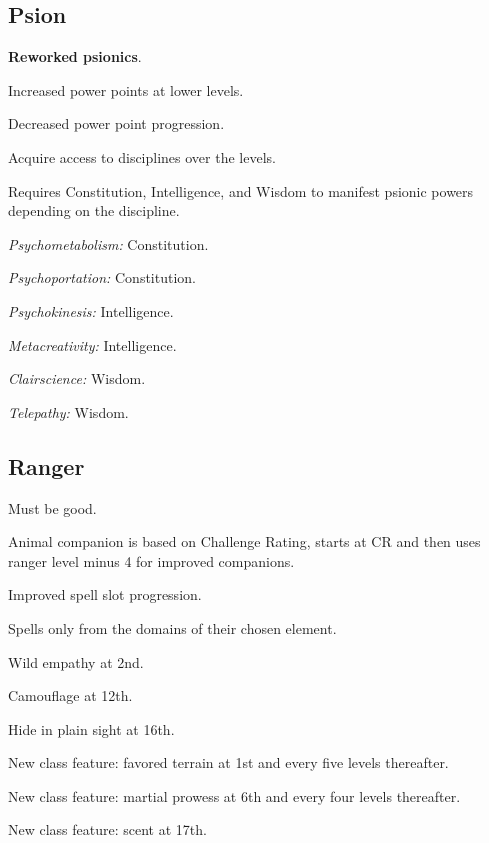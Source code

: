 \subsection{Psion}
\begin{itemize*}
\item \textbf{Reworked psionics}.
\item Increased power points at lower levels.
\item Decreased power point progression.
\item Acquire access to disciplines over the levels.
\item Requires Constitution, Intelligence, and Wisdom to manifest psionic powers depending on the discipline.
	\begin{itemize*}
	\item \textit{Psychometabolism:} Constitution.
	\item \textit{Psychoportation:} Constitution.
	\item \textit{Psychokinesis:} Intelligence.
	\item \textit{Metacreativity:} Intelligence.
	\item \textit{Clairscience:} Wisdom.
	\item \textit{Telepathy:} Wisdom.
	\end{itemize*}
\end{itemize*}


\subsection{Ranger}
\begin{itemize*}
\item Must be good.
\item Animal companion is based on Challenge Rating, starts at CR \onehalf and then uses ranger level minus 4 for improved companions.
\item Improved spell slot progression.
\item Spells only from the domains of their chosen element.
\item Wild empathy at 2nd.
\item Camouflage at 12th.
\item Hide in plain sight at 16th.
\item New class feature: favored terrain at 1st and every five levels thereafter.
\item New class feature: martial prowess at 6th and every four levels thereafter.
\item New class feature: scent at 17th.
\end{itemize*}

